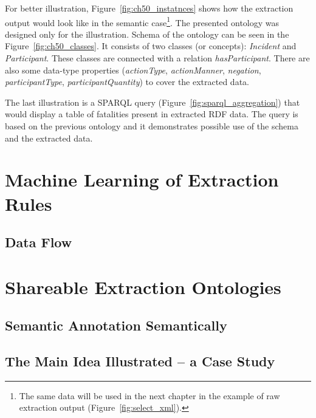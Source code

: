 For better illustration, Figure~\ref{fig:ch50_instatnces} shows how the extraction output would look like in the semantic case\footnote{The same data will be used in the next chapter in the example of raw extraction output (Figure~\ref{fig:select_xml}).}. The presented ontology was designed only for the illustration. Schema of the ontology can be seen in the Figure~\ref{fig:ch50_classes}. It consists of two classes (or concepts): \emph{Incident} and \emph{Participant}. These classes are connected with a relation \emph{hasParticipant}. There are also some data-type properties (\emph{actionType}, \emph{actionManner}, \emph{negation}, \emph{participantType}, \emph{participantQuantity}) to cover the extracted data. 

The last illustration is a SPARQL query (Figure~\ref{fig:sparql_aggregation}) that would display a table of fatalities present in extracted RDF data. The query is based on the previous ontology and it demonstrates possible use of the schema and the extracted data.







\section{Machine Learning of Extraction Rules} \label{sec:methods_learning}

\subsection{Data Flow}

\section{Shareable Extraction Ontologies} \label{sec:methods_Shareable_Extraction_Ontologies}

\subsection{Semantic Annotation Semantically}

\subsection{The Main Idea Illustrated – a Case Study}

